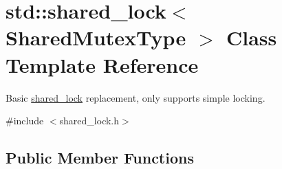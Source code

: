 \hypertarget{classstd_1_1shared__lock}{}\section{std\+:\+:shared\+\_\+lock$<$ Shared\+Mutex\+Type $>$ Class Template Reference}
\label{classstd_1_1shared__lock}


Basic \hyperlink{classstd_1_1shared__lock}{shared\+\_\+lock} replacement, only supports simple locking.  




{\ttfamily \#include $<$shared\+\_\+lock.\+h$>$}

\subsection*{Public Member Functions}
